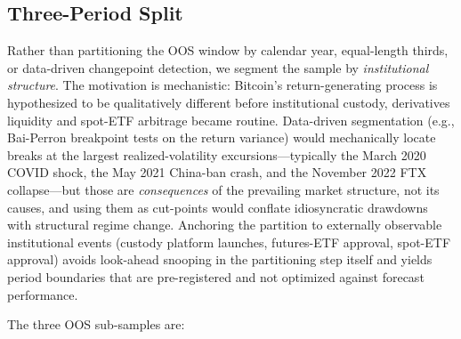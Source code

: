 \subsection{Three-Period Split}

Rather than partitioning the OOS window by calendar year, equal-length thirds, or data-driven changepoint detection, we segment the sample by \emph{institutional structure}. The motivation is mechanistic: Bitcoin's return-generating process is hypothesized to be qualitatively different before institutional custody, derivatives liquidity and spot-ETF arbitrage became routine. Data-driven segmentation (e.g., Bai-Perron breakpoint tests on the return variance) would mechanically locate breaks at the largest realized-volatility excursions---typically the March 2020 COVID shock, the May 2021 China-ban crash, and the November 2022 FTX collapse---but those are \emph{consequences} of the prevailing market structure, not its causes, and using them as cut-points would conflate idiosyncratic drawdowns with structural regime change. Anchoring the partition to externally observable institutional events (custody platform launches, futures-ETF approval, spot-ETF approval) avoids look-ahead snooping in the partitioning step itself and yields period boundaries that are pre-registered and not optimized against forecast performance.

The three OOS sub-samples are:

